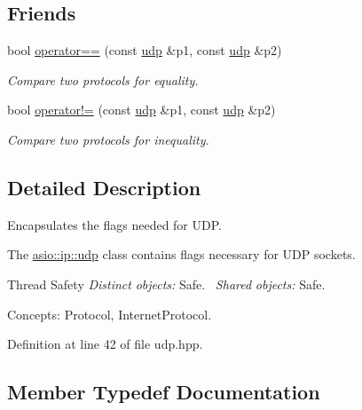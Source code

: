 \subsection*{Friends}
\begin{DoxyCompactItemize}
\item 
bool \hyperlink{classasio_1_1ip_1_1udp_a2cc08fe9f5c9186018e71eebcecb2310}{operator==} (const \hyperlink{classasio_1_1ip_1_1udp}{udp} \&p1, const \hyperlink{classasio_1_1ip_1_1udp}{udp} \&p2)
\begin{DoxyCompactList}\small\item\em Compare two protocols for equality. \end{DoxyCompactList}\item 
bool \hyperlink{classasio_1_1ip_1_1udp_a86bb54ad4ac96d2e219bc2c357476c7c}{operator!=} (const \hyperlink{classasio_1_1ip_1_1udp}{udp} \&p1, const \hyperlink{classasio_1_1ip_1_1udp}{udp} \&p2)
\begin{DoxyCompactList}\small\item\em Compare two protocols for inequality. \end{DoxyCompactList}\end{DoxyCompactItemize}


\subsection{Detailed Description}
Encapsulates the flags needed for U\+D\+P. 

The \hyperlink{classasio_1_1ip_1_1udp}{asio\+::ip\+::udp} class contains flags necessary for U\+D\+P sockets.

\begin{DoxyParagraph}{Thread Safety}
{\itshape Distinct} {\itshape objects\+:} Safe.~\newline
{\itshape Shared} {\itshape objects\+:} Safe.
\end{DoxyParagraph}
\begin{DoxyParagraph}{Concepts\+:}
Protocol, Internet\+Protocol. 
\end{DoxyParagraph}


Definition at line 42 of file udp.\+hpp.



\subsection{Member Typedef Documentation}
\hypertarget{classasio_1_1ip_1_1udp_a6356426903164272827153752845368c}{}
